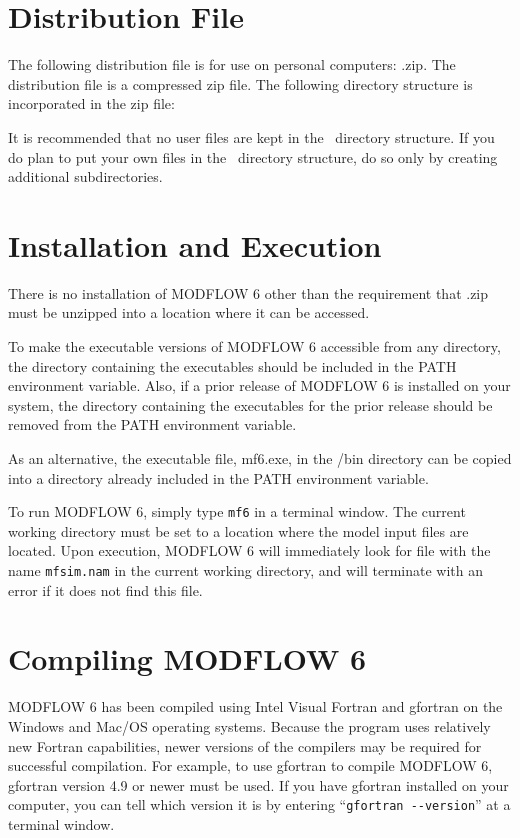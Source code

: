 \documentclass[11pt,twoside,twocolumn]{usgsreport}
\begin{document}
\section{Distribution File}
The following distribution file is for use on personal computers: \modflowversion.zip.  The distribution file is a compressed zip file. The following directory structure is incorporated in the zip file:



It is recommended that no user files are kept in the \modflowversion~directory structure.  If you do plan to put your own files in the \modflowversion~directory structure, do so only by creating additional subdirectories.

\section{Installation and Execution}
There is no installation of MODFLOW 6 other than the requirement that \modflowversion.zip must be unzipped into a location where it can be accessed.  

To make the executable versions of MODFLOW 6 accessible from any directory, the directory containing the executables should be included in the PATH environment variable.  Also, if a prior release of MODFLOW 6 is installed on your system, the directory containing the executables for the prior release should be removed from the PATH environment variable.

As an alternative, the executable file, mf6.exe, in the \modflowversion{}/bin directory can be copied into a directory already included in the PATH environment variable.

To run MODFLOW 6, simply type \texttt{mf6} in a terminal window.  The current working directory must be set to a location where the model input files are located.  Upon execution, MODFLOW 6 will immediately look for file with the name \texttt{mfsim.nam} in the current working directory, and will terminate with an error if it does not find this file.

\section{Compiling MODFLOW 6}
MODFLOW 6 has been compiled using Intel Visual Fortran and gfortran on the Windows and Mac/OS operating systems.  Because the program uses relatively new Fortran capabilities, newer versions of the compilers may be required for successful compilation.  For example, to use gfortran to compile MODFLOW 6, gfortran version 4.9 or newer must be used.  If you have gfortran installed on your computer, you can tell which version it is by entering ``\verb|gfortran --version|'' at a terminal window.
\end{document}
